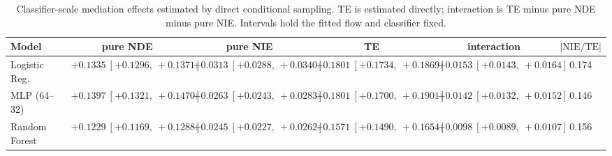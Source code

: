 \begin{table}[htbp]
  \centering
  \caption{Classifier-scale mediation effects estimated by direct conditional sampling. TE is estimated directly; interaction is TE minus pure NDE minus pure NIE. Intervals hold the fitted flow and classifier fixed.}
  \label{tab:adult_gap_overall}
  \begin{tabular}{lccccc}
    \toprule
    Model & pure NDE & pure NIE & TE & interaction & $|\mathrm{NIE}/\mathrm{TE}|$ \\
    \midrule
    Logistic Reg. & $+0.1335\ [+0.1296,\ +0.1371]$ & $+0.0313\ [+0.0288,\ +0.0340]$ & $+0.1801\ [+0.1734,\ +0.1869]$ & $+0.0153\ [+0.0143,\ +0.0164]$ & 0.174 \\
    MLP (64--32) & $+0.1397\ [+0.1321,\ +0.1470]$ & $+0.0263\ [+0.0243,\ +0.0283]$ & $+0.1801\ [+0.1700,\ +0.1901]$ & $+0.0142\ [+0.0132,\ +0.0152]$ & 0.146 \\
    Random Forest & $+0.1229\ [+0.1169,\ +0.1288]$ & $+0.0245\ [+0.0227,\ +0.0262]$ & $+0.1571\ [+0.1490,\ +0.1654]$ & $+0.0098\ [+0.0089,\ +0.0107]$ & 0.156 \\
    \bottomrule
  \end{tabular}
\end{table}